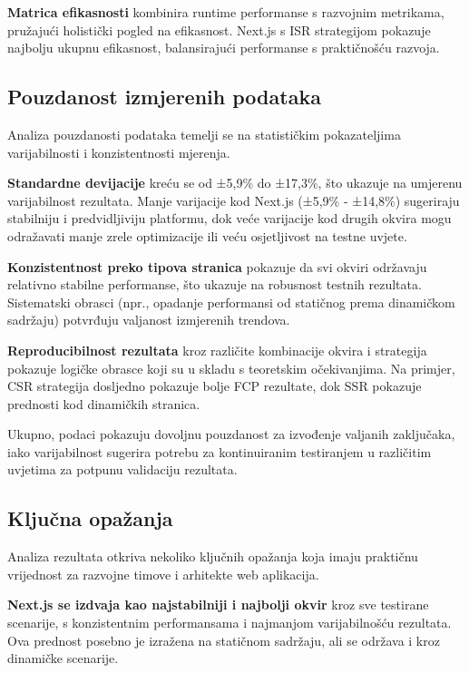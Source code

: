 \textbf{Matrica efikasnosti} kombinira runtime performanse s razvojnim metrikama, pružajući holistički pogled na efikasnost. Next.js s ISR strategijom pokazuje najbolju ukupnu efikasnost, balansirajući performanse s praktičnošću razvoja.

\subsection{Pouzdanost izmjerenih podataka}

Analiza pouzdanosti podataka temelji se na statističkim pokazateljima varijabilnosti i konzistentnosti mjerenja.

\textbf{Standardne devijacije} kreću se od ±5,9\% do ±17,3\%, što ukazuje na umjerenu varijabilnost rezultata. Manje varijacije kod Next.js (±5,9\% - ±14,8\%) sugeriraju stabilniju i predvidljiviju platformu, dok veće varijacije kod drugih okvira mogu odražavati manje zrele optimizacije ili veću osjetljivost na testne uvjete.

\textbf{Konzistentnost preko tipova stranica} pokazuje da svi okviri održavaju relativno stabilne performanse, što ukazuje na robusnost testnih rezultata. Sistematski obrasci (npr., opadanje performansi od statičnog prema dinamičkom sadržaju) potvrđuju valjanost izmjerenih trendova.

\textbf{Reproducibilnost rezultata} kroz različite kombinacije okvira i strategija pokazuje logičke obrasce koji su u skladu s teoretskim očekivanjima. Na primjer, CSR strategija dosljedno pokazuje bolje FCP rezultate, dok SSR pokazuje prednosti kod dinamičkih stranica.

Ukupno, podaci pokazuju dovoljnu pouzdanost za izvođenje valjanih zaključaka, iako varijabilnost sugerira potrebu za kontinuiranim testiranjem u različitim uvjetima za potpunu validaciju rezultata.

\subsection{Ključna opažanja}

Analiza rezultata otkriva nekoliko ključnih opažanja koja imaju praktičnu vrijednost za razvojne timove i arhitekte web aplikacija.

\textbf{Next.js se izdvaja kao najstabilniji i najbolji okvir} kroz sve testirane scenarije, s konzistentnim performansama i najmanjom varijabilnošću rezultata. Ova prednost posebno je izražena na statičnom sadržaju, ali se održava i kroz dinamičke scenarije.

